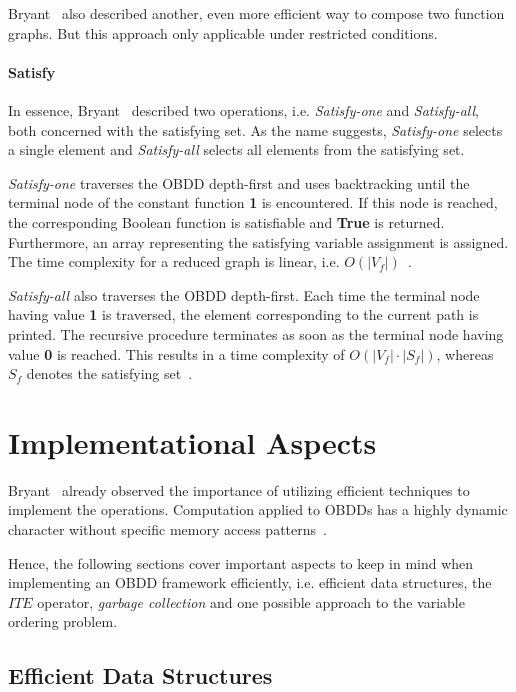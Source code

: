 \documentclass{vldb}
\begin{document}
Bryant~\cite{BRYANT86} also described another, even more efficient way to compose
two function graphs. But this approach only applicable under restricted conditions.

\paragraph*{Satisfy}
\mbox{} %

In essence, Bryant~\cite{BRYANT86} described two operations, i.e.
\textit{Satisfy-one} and \textit{Satisfy-all}, both concerned with the satisfying
set. As the name suggests, \textit{Satisfy-one} selects a single element and
\textit{Satisfy-all} selects all elements from the satisfying set.

\textit{Satisfy-one} traverses the OBDD depth-first and uses backtracking until
the terminal node of the constant function \textbf{1} is encountered. If this node
is reached, the corresponding Boolean function is satisfiable and \textbf{True}
is returned. Furthermore, an array representing the satisfying variable assignment
is assigned. The time complexity for a reduced graph is linear, i.e.
$O(|V_f|)$~\cite{BRYANT86}.

\textit{Satisfy-all} also traverses the OBDD depth-first. Each time the terminal
node having value \textbf{1} is traversed, the element corresponding to the current
path is printed. The recursive procedure terminates as soon as the terminal node
having value \textbf{0} is reached. This results in a time complexity of
$O(|V_f| \cdot |S_f|)$, whereas $S_f$ denotes the satisfying set~\cite{BRYANT86}.

\section{Implementational Aspects}
\label{sec:implementational-aspects}

Bryant~\cite{BRYANT86} already observed the importance of utilizing efficient
techniques to implement the operations. Computation applied to OBDDs has a highly
dynamic character without specific memory access patterns~\cite{BRYANT92}.

Hence, the following sections cover important aspects to keep in mind when
implementing an OBDD framework efficiently, i.e. efficient data structures, the
$ITE$ operator, \textit{garbage collection} and one possible approach to the variable
ordering problem.

\subsection{Efficient Data Structures}
\label{subsec:efficient-data-structures}
\end{document}
